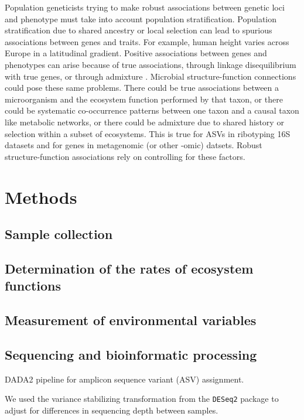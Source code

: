\documentclass{article}
\begin{document}
Population geneticists trying to make robust associations between genetic loci
and phenotype must take into account population stratification. Population
stratification due to shared ancestry or local selection can lead to spurious
associations between genes and traits. For example, human height varies
across Europe in a latitudinal gradient. Positive associations between genes and
phenotypes can arise because of true associations, through linkage
disequilibrium with true genes, or through admixture \citep{lander1994}.
Microbial structure-function connections could pose these same problems. There
could be true associations between a microorganism and the ecosystem function
performed by that taxon, or there could be systematic
co-occurrence patterns between one taxon and a causal taxon like metabolic
networks, or there could be admixture due to shared history or selection within
a subset of ecosystems. This is true for ASVs in ribotyping 16S datasets and for
genes in metagenomic (or other -omic) datsets. 
Robust structure-function associations rely on
controlling for these factors.

\section{Methods}

\subsection{Sample collection}

\subsection{Determination of the rates of ecosystem functions}

\subsection{Measurement of environmental variables}

\subsection{Sequencing and bioinformatic processing}

DADA2 pipeline for amplicon sequence variant (ASV) assignment.

We used the variance stabilizing transformation from the \texttt{DESeq2}
package to adjust for differences in sequencing depth between samples. 
\end{document}
